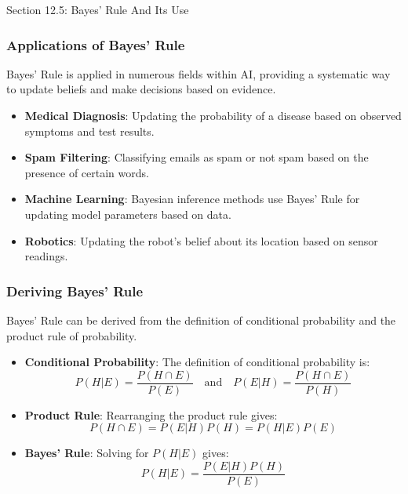 \begin{notes}{Section 12.5: Bayes' Rule And Its Use}
\begin{highlight}
    \end{highlight}
    
    \subsubsection*{Applications of Bayes' Rule}
    
    Bayes' Rule is applied in numerous fields within AI, providing a systematic way to update beliefs and make decisions based on evidence.
    
    \begin{highlight}
    
        \begin{itemize}
            \item \textbf{Medical Diagnosis}: Updating the probability of a disease based on observed symptoms and test results.
            \item \textbf{Spam Filtering}: Classifying emails as spam or not spam based on the presence of certain words.
            \item \textbf{Machine Learning}: Bayesian inference methods use Bayes' Rule for updating model parameters based on data.
            \item \textbf{Robotics}: Updating the robot's belief about its location based on sensor readings.
        \end{itemize}
    
    \end{highlight}
    
    \subsubsection*{Deriving Bayes' Rule}
    
    Bayes' Rule can be derived from the definition of conditional probability and the product rule of probability.
    
    \begin{highlight}
    
        \begin{itemize}
            \item \textbf{Conditional Probability}: The definition of conditional probability is:
            \[
            P(H | E) = \frac{P(H \cap E)}{P(E)} \quad \text{and} \quad P(E | H) = \frac{P(H \cap E)}{P(H)}
            \]
            \item \textbf{Product Rule}: Rearranging the product rule gives:
            \[
            P(H \cap E) = P(E | H) P(H) = P(H | E) P(E)
            \]
            \item \textbf{Bayes' Rule}: Solving for $P(H | E)$ gives:
            \[
            P(H | E) = \frac{P(E | H) P(H)}{P(E)}
            \]
        \end{itemize}
    

\end{highlight}
\end{notes}
